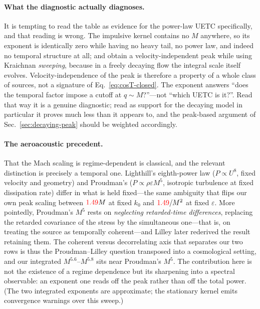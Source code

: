 \documentclass[10pt,prd,aps,nobibnotes,superscriptaddress,preprintnumbers,notitlepage]{revtex4-1}
\newcommand{\add}[1]{{\color{red}#1}}
\newcommand{\add}[1]{#1}
\begin{document}
\paragraph{What the diagnostic actually diagnoses.} It is tempting to read the
table as evidence for the power-law UETC specifically, and that reading is
wrong. The impulsive kernel contains no $M$ anywhere, so its exponent is
identically zero while having no heavy tail, no power law, and indeed no
temporal structure at all; and \cite{Auclair:2022jod} obtain a velocity-independent
peak while using Kraichnan \emph{sweeping}, because in a freely decaying flow the
integral scale itself evolves. Velocity-independence of the peak is therefore a
property of a whole class of sources, not a signature of
Eq.~\eqref{eq:cosT-closed}. The exponent answers ``does the temporal factor
impose a cutoff at $q\sim M$?''---not ``which UETC is it?''. Read that way it is
a genuine diagnostic; read as support for the decaying model in particular it
proves much less than it appears to, and the peak-based argument of
Sec.~\ref{sec:decaying-peak} should be weighted accordingly.

\paragraph{The aeroacoustic precedent.} That the Mach scaling is regime-dependent
is classical, and the relevant distinction is precisely a temporal one.
Lighthill's eighth-power law \cite{Lighthill:1952} ($P\propto U^{8}$, fixed
velocity and geometry) and Proudman's \cite{Proudman:1952}
($P\propto\rho\varepsilon M^{5}$, isotropic turbulence at fixed dissipation
rate) differ in what is held fixed---the same ambiguity that flips our own peak
scaling between $\add{1.49}M$ at fixed $k_{0}$ and $\add{1.49}/M^{2}$ at fixed $\varepsilon$.
More pointedly, Proudman's $M^{5}$ rests on \emph{neglecting retarded-time
differences}, replacing the retarded covariance of the stress by the simultaneous
one---that is, on treating the source as temporally coherent---and Lilley
\cite{Lilley:1994} later rederived the result retaining them. The coherent versus
decorrelating axis that separates our two rows is thus the Proudman--Lilley
question transposed into a cosmological setting, and our integrated
$M^{5.6}$--$M^{5.8}$ sits near Proudman's $M^{5}$. The contribution here is not
the existence of a regime dependence but its sharpening into a spectral
observable: an exponent one reads off the peak rather than off the total power.
(The two integrated exponents are approximate; the stationary kernel emits
convergence warnings over this sweep.)
\end{document}
